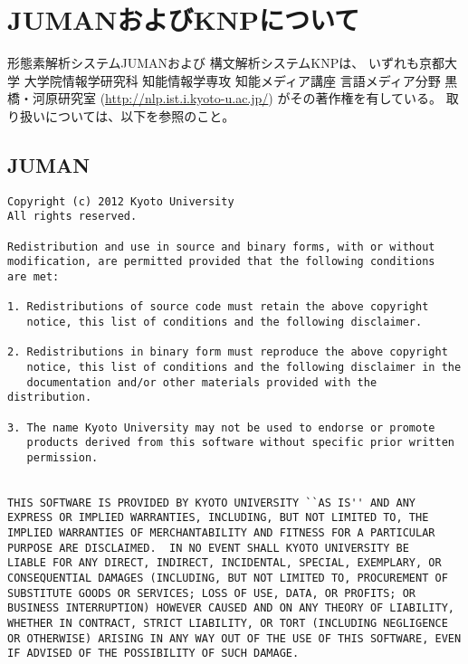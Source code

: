 
%

\section{JUMANおよびKNPについて\label{sect:copyright}}

形態素解析システムJUMANおよび
構文解析システムKNPは、
いずれも京都大学 大学院情報学研究科 知能情報学専攻
知能メディア講座 言語メディア分野 黒橋・河原研究室
(\url{http://nlp.ist.i.kyoto-u.ac.jp/})
がその著作権を有している。
取り扱いについては、以下を参照のこと。

\subsection{JUMAN}
\begin{Verbatim}[baselinestretch=0.7,frame=single]
Copyright (c) 2012 Kyoto University
All rights reserved.

Redistribution and use in source and binary forms, with or without
modification, are permitted provided that the following conditions
are met:

1. Redistributions of source code must retain the above copyright
   notice, this list of conditions and the following disclaimer.

2. Redistributions in binary form must reproduce the above copyright
   notice, this list of conditions and the following disclaimer in the
   documentation and/or other materials provided with the distribution.

3. The name Kyoto University may not be used to endorse or promote
   products derived from this software without specific prior written
   permission.


THIS SOFTWARE IS PROVIDED BY KYOTO UNIVERSITY ``AS IS'' AND ANY
EXPRESS OR IMPLIED WARRANTIES, INCLUDING, BUT NOT LIMITED TO, THE
IMPLIED WARRANTIES OF MERCHANTABILITY AND FITNESS FOR A PARTICULAR
PURPOSE ARE DISCLAIMED.  IN NO EVENT SHALL KYOTO UNIVERSITY BE
LIABLE FOR ANY DIRECT, INDIRECT, INCIDENTAL, SPECIAL, EXEMPLARY, OR
CONSEQUENTIAL DAMAGES (INCLUDING, BUT NOT LIMITED TO, PROCUREMENT OF
SUBSTITUTE GOODS OR SERVICES; LOSS OF USE, DATA, OR PROFITS; OR
BUSINESS INTERRUPTION) HOWEVER CAUSED AND ON ANY THEORY OF LIABILITY,
WHETHER IN CONTRACT, STRICT LIABILITY, OR TORT (INCLUDING NEGLIGENCE
OR OTHERWISE) ARISING IN ANY WAY OUT OF THE USE OF THIS SOFTWARE, EVEN
IF ADVISED OF THE POSSIBILITY OF SUCH DAMAGE.
\end{Verbatim}

